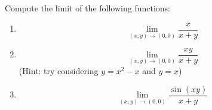 \documentclass[openany]{book}
\begin{document}
\begin{prob}
    Compute the limit of the following functions:
    \begin{enumerate}
        \item \begin{equation*}
            \lim_{(x,y)\to(0,0)}\frac{x}{x+y} 
        \end{equation*}
        \item \begin{equation*}
            \lim_{(x,y)\to(0,0)}\frac{xy}{x+y}
        \end{equation*}
        (Hint: try considering $y=x^2-x$ and $y=x$)
        \item \begin{equation*}
            \lim_{(x,y)\to (0,0)}\frac{\sin(xy)}{x+y}
        \end{equation*}
    \end{enumerate}
\end{prob}
\end{document}
